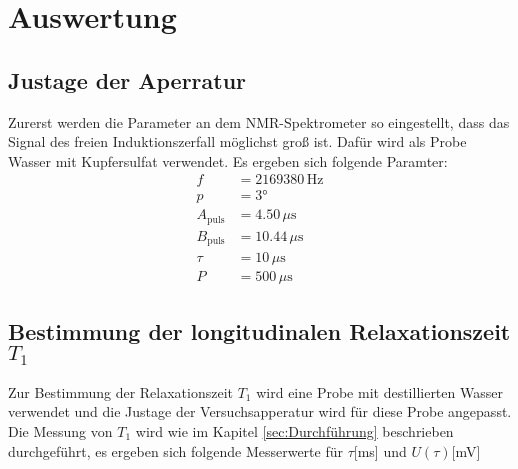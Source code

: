 \section{Auswertung}
\label{sec:Auswertung}
\subsection{Justage der Aperratur}
Zurerst werden die Parameter an dem NMR-Spektrometer so eingestellt, dass das
Signal des freien Induktionszerfall möglichst groß ist. Dafür wird als
Probe Wasser mit Kupfersulfat verwendet.
Es ergeben sich folgende Paramter:
\begin{align}
    \label{Parameter}
    f&=2169380 \, \text{Hz}\\
    p&=3°\\
    A_\text{puls}&=4.50 \, \mu \text{s}\\
    B_\text{puls}&=10.44 \, \mu \text{s}\\
    \tau&=10 \, \mu \text{s}\\
    P&=500 \, \mu \text{s}
\end{align}

\subsection{Bestimmung der longitudinalen Relaxationszeit $T_1$}
Zur Bestimmung der Relaxationszeit $T_1$ wird eine Probe mit destillierten
Wasser verwendet und die Justage der Versuchsapperatur wird für diese Probe
angepasst.
Die Messung von $T_1$ wird wie im Kapitel \ref{sec:Durchführung} beschrieben
durchgeführt, es ergeben sich folgende Messerwerte für $\tau$[ms] und $U(\tau)$[mV]

